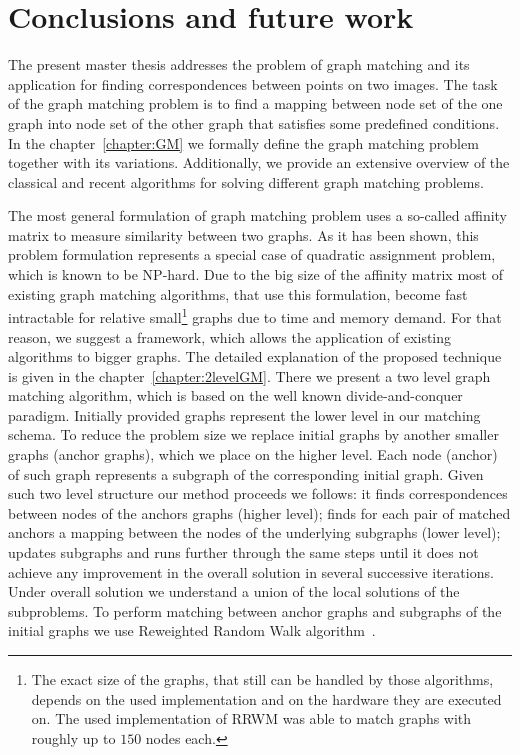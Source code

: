 \chapter{Conclusions and future work}
The present master thesis addresses the problem of graph matching and its application for finding correspondences between points on two images. The task of the graph matching problem is to find a mapping between node set of the one graph into node set of the other graph that satisfies some predefined conditions. In the chapter~\ref{chapter:GM} we formally define the graph matching problem together with its variations. Additionally, we provide an extensive overview of the classical and recent algorithms for solving different graph matching problems. 


The most general formulation of graph matching problem uses a so-called affinity matrix to measure similarity between two graphs. As it has been shown, this problem formulation represents a special case of quadratic assignment problem, which is known to be NP-hard. Due to the big size of the affinity matrix most of existing graph matching algorithms, that use this formulation, become fast intractable for relative small\footnote{The exact size of the graphs, that still can be handled by those algorithms, depends on the used implementation and on the hardware they are executed on. The used implementation of RRWM was able to match graphs with roughly up to $150$ nodes each.} graphs due to time and memory demand. For that reason, we suggest a framework, which allows the application of existing algorithms to bigger graphs. The detailed explanation of the proposed technique is given in the chapter~\ref{chapter:2levelGM}. There we present a two level graph matching algorithm, which is based on the well known divide-and-conquer paradigm. Initially provided graphs represent the lower level in our matching schema. To reduce the problem size we replace initial graphs by another smaller graphs (anchor graphs), which we place on the higher level. Each node (anchor) of such graph represents a subgraph of the corresponding initial graph. Given such two level structure our method proceeds we follows: it finds correspondences between nodes of the anchors graphs (higher level); finds for each pair of matched anchors a mapping between the nodes of the underlying subgraphs (lower level); updates subgraphs and runs further through the same steps until it does not achieve any improvement in the overall solution in several successive iterations. Under overall solution we understand a union of the local solutions of the subproblems. To perform matching between anchor graphs and subgraphs of the initial graphs we use Reweighted Random Walk algorithm~\cite{Cho2010_RRWM}.

